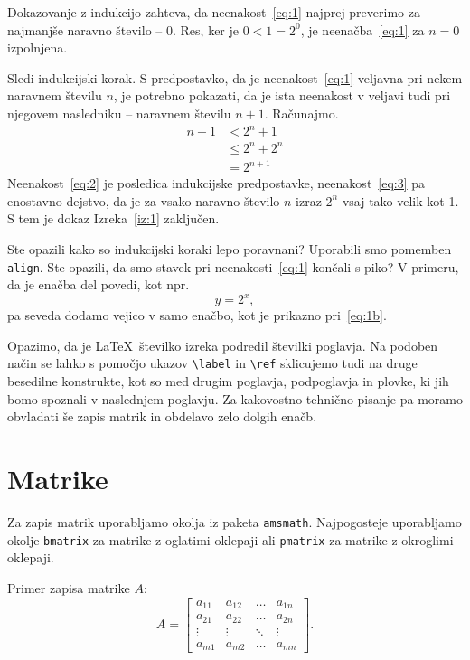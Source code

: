\documentclass[a4paper,12pt,openright]{book}
\begin{document}
\begin{dokaz}
  Dokazovanje z indukcijo zahteva, da neenakost~\eqref{eq:1} najprej preverimo za najmanjše naravno število -- $0$.
  Res, ker je $0 < 1 = 2^0$, je neenačba~\eqref{eq:1} za $n=0$ izpolnjena.

  Sledi indukcijski korak. S predpostavko, da je neenakost~\eqref{eq:1} veljavna pri nekem naravnem številu $n$, je potrebno pokazati, da je ista neenakost v veljavi tudi pri njegovem nasledniku -- naravnem številu $n+1$.
  Računajmo.
  \begin{align}
    n+1 & < 2^n + 1       \label{eq:2}\\
    & \le 2^n + 2^n \label{eq:3}\\
    & = 2^{n+1}       \nonumber
  \end{align}
  Neenakost~\eqref{eq:2} je posledica indukcijske predpostavke, neenakost~\eqref{eq:3} pa enostavno dejstvo, da je za vsako naravno število $n$ izraz $2^n$ vsaj tako velik kot 1.
  S tem je dokaz Izreka~\ref{iz:1} zaključen.
\end{dokaz}

Ste opazili kako so indukcijski koraki lepo poravnani? Uporabili smo pomemben \texttt{align}. Ste opazili, da smo stavek pri neenakosti~\ref{eq:1} končali s piko? V primeru, da je enačba del povedi, kot npr.
 \begin{equation}
    y = 2^x,
    \label{eq:1b}
  \end{equation}
pa seveda dodamo vejico v samo enačbo, kot je prikazno pri~\ref{eq:1b}.

Opazimo, da je \LaTeX\ številko izreka podredil številki poglavja.
Na podoben način se lahko s pomočjo ukazov \verb|\label| in \verb|\ref| sklicujemo tudi na druge besedilne konstrukte, kot so med drugim poglavja, podpoglavja in plovke, ki jih bomo spoznali v naslednjem poglavju. Za kakovostno tehnično pisanje pa moramo obvladati še zapis matrik in obdelavo zelo dolgih enačb.

\section{Matrike}

Za zapis matrik uporabljamo okolja iz paketa \texttt{amsmath}. Najpogosteje uporabljamo okolje \texttt{bmatrix} za matrike z oglatimi oklepaji ali \texttt{pmatrix} za matrike z okroglimi oklepaji.

Primer zapisa matrike $A$:
\begin{equation}
    A = \begin{bmatrix}
        a_{11} & a_{12} & \dots  & a_{1n} \\
        a_{21} & a_{22} & \dots  & a_{2n} \\
        \vdots & \vdots & \ddots & \vdots \\
        a_{m1} & a_{m2} & \dots  & a_{mn}
    \end{bmatrix}.
\end{equation}
\end{document}
